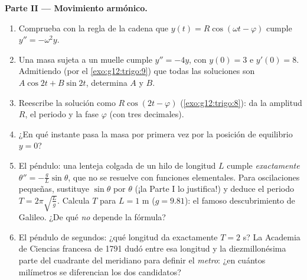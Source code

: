 \begin{problem}
\medskip
\noindent\textbf{Parte II --- Movimiento armónico.}
\begin{enumerate}[resume]
  \item Comprueba con la regla de la cadena que
        $y(t) = R\cos(\omega t - \varphi)$ cumple $y'' = -\omega^2 y$.
  \item Una masa sujeta a un muelle cumple $y'' = -4y$, con $y(0) = 3$ e
        $y'(0) = 8$. Admitiendo (por el \cref{exo:g12:trigo:9}) que todas
        las soluciones son $A\cos 2t + B\sin 2t$, determina $A$ y $B$.
  \item Reescribe la solución como $R\cos(2t - \varphi)$
        (\cref{exo:g12:trigo:8}): da la amplitud $R$, el periodo y la fase
        $\varphi$ (con tres decimales).
  \item ¿En qué instante pasa la masa por primera vez por la posición de
        equilibrio $y = 0$?
  \item El péndulo: una lenteja colgada de un hilo de longitud $L$ cumple
        \emph{exactamente} $\theta'' = -\frac gL \sin\theta$, que no se
        resuelve con funciones elementales. Para oscilaciones pequeñas,
        sustituye $\sin\theta$ por $\theta$ (¡la Parte I lo justifica!) y
        deduce el periodo $T = 2\pi\sqrt{\frac Lg}$. Calcula $T$ para
        $L = 1$ m ($g = 9.81$): el famoso descubrimiento de Galileo. ¿De
        qué \emph{no} depende la fórmula?
  \item El péndulo de segundos: ¿qué longitud da exactamente $T = 2$ s? La
        Academia de Ciencias francesa de 1791 dudó entre esa longitud y la
        diezmillonésima parte del cuadrante del meridiano para definir el
        \emph{metro}: ¿en cuántos milímetros se diferencian los dos
        candidatos?
\end{enumerate}


\end{problem}
